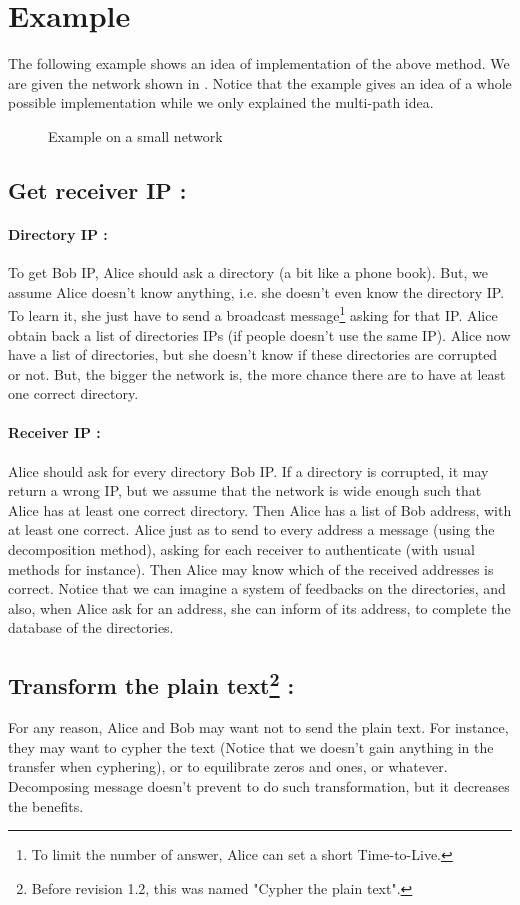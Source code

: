 \documentclass[a4paper, onecolumn, 10pt]{article}
\numberwithin{equation}{section}
\begin{document}
\newpage
\appendix 
\section{Example}
The following example shows an idea of implementation of the above method. We are given the network shown in . Notice that the example gives an idea of a whole possible implementation while we only explained the multi-path idea.
\begin{figure}[h]
  \begin{center}
    
    \caption{Example on a small network}
    \label{fig:example0}
  \end{center}
\end{figure}
\subsection{Get receiver IP :}
\paragraph{Directory IP :}
To get Bob IP, Alice should ask a directory (a bit like a phone book). But, we assume Alice doesn't know anything, i.e. she doesn't even know the directory IP. To learn it, she just have to send a broadcast message\footnote{To limit the number of answer, Alice can set a short Time-to-Live.} asking for that IP. Alice obtain back a list of directories IPs (if people doesn't use the same IP). Alice now have a list of directories, but she doesn't know if these directories are corrupted or not. But, the bigger the network is, the more chance there are to have at least one correct directory.
\paragraph{Receiver IP :}
Alice should ask for every directory Bob IP. If a directory is corrupted, it may return a wrong IP, but we assume that the network is wide enough such that Alice has at least one correct directory. Then Alice has a list of Bob address, with at least one correct. Alice just as to send to every address a message (using the decomposition method), asking for each receiver to authenticate (with usual methods for instance). Then Alice may know which of the received addresses is correct. Notice that we can imagine a system of feedbacks on the directories, and also, when Alice ask for an address, she can inform of its address, to complete the database of the directories.
\subsection{Transform the plain text\protect\footnote{Before revision 1.2, this was named "Cypher the plain text".} :} 
For any reason, Alice and Bob may want not to send the plain text. For instance, they may want to cypher the text (Notice that we doesn't gain anything in the transfer when cyphering), or to equilibrate zeros and ones, or whatever. Decomposing message doesn't prevent to do such transformation, but it decreases the benefits.
\end{document}
